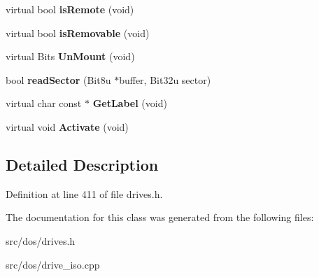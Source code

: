 \begin{DoxyCompactItemize}
\item 
\hypertarget{classisoDrive_a3bf3c53009a3bd8ca3fe822d9ff2487d}{virtual bool {\bfseries is\-Remote} (void)}\label{classisoDrive_a3bf3c53009a3bd8ca3fe822d9ff2487d}

\item 
\hypertarget{classisoDrive_ab3a5c7695c171b7132ee2b8d08ebcd64}{virtual bool {\bfseries is\-Removable} (void)}\label{classisoDrive_ab3a5c7695c171b7132ee2b8d08ebcd64}

\item 
\hypertarget{classisoDrive_ad58ab0d475eec136f5738b4ac8d33136}{virtual Bits {\bfseries Un\-Mount} (void)}\label{classisoDrive_ad58ab0d475eec136f5738b4ac8d33136}

\item 
\hypertarget{classisoDrive_a4e6ef7d78f8bc93437a216f1b88b3d43}{bool {\bfseries read\-Sector} (Bit8u $\ast$buffer, Bit32u sector)}\label{classisoDrive_a4e6ef7d78f8bc93437a216f1b88b3d43}

\item 
\hypertarget{classisoDrive_acf1acbf5887b1d557589ea6eb1301a07}{virtual char const $\ast$ {\bfseries Get\-Label} (void)}\label{classisoDrive_acf1acbf5887b1d557589ea6eb1301a07}

\item 
\hypertarget{classisoDrive_a13b831240141955fb769a1d7b3dca700}{virtual void {\bfseries Activate} (void)}\label{classisoDrive_a13b831240141955fb769a1d7b3dca700}

\end{DoxyCompactItemize}


\subsection{Detailed Description}


Definition at line 411 of file drives.\-h.



The documentation for this class was generated from the following files\-:\begin{DoxyCompactItemize}
\item 
src/dos/drives.\-h\item 
src/dos/drive\-\_\-iso.\-cpp\end{DoxyCompactItemize}
